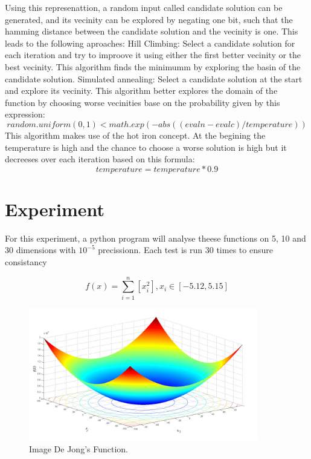 \documentclass{report}
\begin{document}
Using this represenattion, a random input called candidate solution can be generated, and its vecinity can be explored by negating one bit, such that the hamming distance between the candidate solution and the vecinity is one. This leads to the following aproaches:
\newline
\newline
Hill Climbing:
\newline
\newline
Select a candidate solution for each iteration and try to improove it using either the first better vecinity or the best vecinity. This algorithm finds the minimumm by exploring the basin of the candidate solution.
\newline
\newline
Simulated annealing:
\newline
\newline
Select a candidate solution at the start and explore its vecinity. This algorithm better explores the domain of the function by choosing worse vecinities base on the probability given by this expression:
\newline
$$random.uniform(0, 1) < math.exp(-abs((evaln - evalc) / temperature))$$
\newline
This algorithm makes use of the hot iron concept. At the begining the temperature  is high and the chance to choose a worse solution is high but it decreeses over each iteration based on this formula:
\newline
$$temperature = temperature * 0.9$$


\section{Experiment}

For this experiment, a python program will analyse theese functions on 5, 10 and 30 dimensions with $10^{-5}$ precissionn. Each test is run 30 times to ensure consistancy

\begin{figure}[!h]
  \centering
  $$ f(x) = \sum_{i=1}^n \left[ x_i^2 \right],
   x_i \in \left[ -5.12, 5.15 \right]$$

  \includegraphics[width=100mm,scale=0.5]{De_Jong_function}
  \caption{Image De Jong's Function.\protect\footnotemark}
\end{figure}
\end{document}
